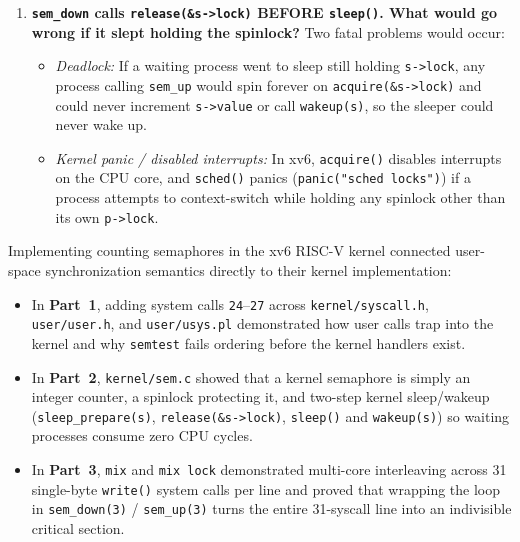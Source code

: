 \documentclass{../latex/utmreport}
\providecommand{\tightlist}{\setlength{\itemsep}{0pt}\setlength{\parskip}{0pt}}
\begin{document}
\begin{enumerate}
\item \textbf{\texttt{sem\_down} calls \texttt{release(\&s->lock)} BEFORE \texttt{sleep()}. What would go wrong if it slept holding the spinlock?}
Two fatal problems would occur:
\begin{itemize}
\tightlist
\item \emph{Deadlock:} If a waiting process went to sleep still holding \texttt{s->lock}, any process calling \texttt{sem\_up} would spin forever on \texttt{acquire(\&s->lock)} and could never increment \texttt{s->value} or call \texttt{wakeup(s)}, so the sleeper could never wake up.
\item \emph{Kernel panic / disabled interrupts:} In xv6, \texttt{acquire()} disables interrupts on the CPU core, and \texttt{sched()} panics (\texttt{panic("sched locks")}) if a process attempts to context-switch while holding any spinlock other than its own \texttt{p->lock}.
\end{itemize}
\end{enumerate}

\utmconclusions

Implementing counting semaphores in the xv6 RISC-V kernel connected user-space synchronization semantics directly to their kernel implementation:
\begin{itemize}
\tightlist
\item In \textbf{Part~1}, adding system calls \texttt{24}--\texttt{27} across \texttt{kernel/syscall.h}, \texttt{user/user.h}, and \texttt{user/usys.pl} demonstrated how user calls trap into the kernel and why \texttt{semtest} fails ordering before the kernel handlers exist.
\item In \textbf{Part~2}, \texttt{kernel/sem.c} showed that a kernel semaphore is simply an integer counter, a spinlock protecting it, and two-step kernel sleep/wakeup (\texttt{sleep\_prepare(s)}, \texttt{release(\&s->lock)}, \texttt{sleep()} and \texttt{wakeup(s)}) so waiting processes consume zero CPU cycles.
\item In \textbf{Part~3}, \texttt{mix} and \texttt{mix lock} demonstrated multi-core interleaving across 31 single-byte \texttt{write()} system calls per line and proved that wrapping the loop in \texttt{sem\_down(3)} / \texttt{sem\_up(3)} turns the entire 31-syscall line into an indivisible critical section.
\end{itemize}
\end{document}
